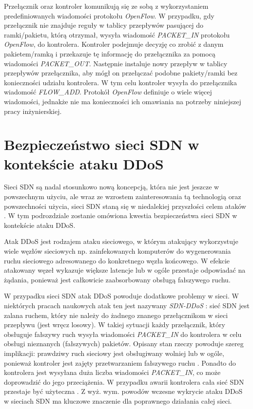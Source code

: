 Przełącznik oraz kontroler komunikują się ze sobą z wykorzystaniem
predefiniowanych wiadomości protokołu \textit{OpenFlow}. W przypadku, gdy
przełącznik nie znajduje reguły w tablicy przepływów pasującej do ramki/pakietu,
którą otrzymał, wysyła wiadomość \textit{PACKET\_IN} protokołu
\textit{OpenFlow}, do kontrolera. Kontroler podejmuje decyzję co zrobić z danym 
pakietem/ramką i przekazuje tę informację do przełącznika za pomocą wiadomości
\mbox{\textit{PACKET\_OUT}}. Następnie instaluje nowy przepływ w tablicy przepływów
przełącznika, aby mógł on przełączać podobne pakiety/ramki bez konieczności
udziału kontrolera. W tym celu kontroler wysyła do przełącznika wiadomość
\textit{FLOW\_ADD}. Protokół \textit{OpenFlow} definiuje o wiele więcej
wiadomości, jednakże nie ma konieczności ich omawiania na potrzeby niniejszej
pracy inżynierskiej.

\section{Bezpieczeństwo sieci SDN w kontekście ataku DDoS}

Sieci SDN są nadal stosunkowo nową koncepcją, która nie jest jeszcze w
powszechnym użyciu, ale wraz ze wzrostem zainteresowania tą technologią oraz
powszechności użycia, sieci SDN staną się w niedalekiej przyszłości celem ataków
\cite{sdnsecurityblog}. W tym podrozdziale zostanie omówiona kwestia
bezpieczeństwa sieci SDN w kontekście ataku DDoS.

Atak DDoS jest rodzajem ataku sieciowego, w którym atakujący wykorzystuje wiele
węzłów sieciowych np. zainfekowanych komputerów do wygenerowania ruchu
sieciowego adresowanego do konkretnego węzła końcowego. W efekcie atakowany
węzeł wykazuje większe latencje lub w ogóle przestaje odpowiadać na żądania,
ponieważ jest całkowicie zaabsorbowany obsługą fałszywego ruchu.

W przypadku sieci SDN atak DDoS powoduje dodatkowe problemy w sieci. W
niektórych pracach naukowych atak ten jest nazywany \textit{SDN-DDoS}
\cite{ddosbronksarticle}: sieć SDN jest zalana ruchem, który nie należy do
żadnego znanego przełącznikom w sieci przepływu (jest wręcz losowy). W takiej
sytuacji każdy przełącznik, który obsługuje fałszywy ruch wysyła wiadomości
\textit{PACKET\_IN} do kontrolera w celu obsługi nieznanych (fałszywych)
pakietów. Opisany stan rzeczy powoduje szereg implikacji: prawdziwy ruch
sieciowy jest obsługiwany wolniej lub w ogóle, ponieważ kontroler jest zajęty
przetwarzaniem fałszywego ruchu \cite{indiaarticle}. Ponadto do kontrolera jest
wysyłana duża liczba wiadomości \textit{PACKET\_IN}, co może doprowadzić do jego
przeciążenia. W przypadku awarii kontrolera cała sieć SDN przestaje być
użyteczna \cite{ddoskoreaarticle}. Z wyż. wym. powodów wczesne wykrycie ataku
DDoS w sieciach SDN ma kluczowe znaczenie dla poprawnego działania całej sieci.

